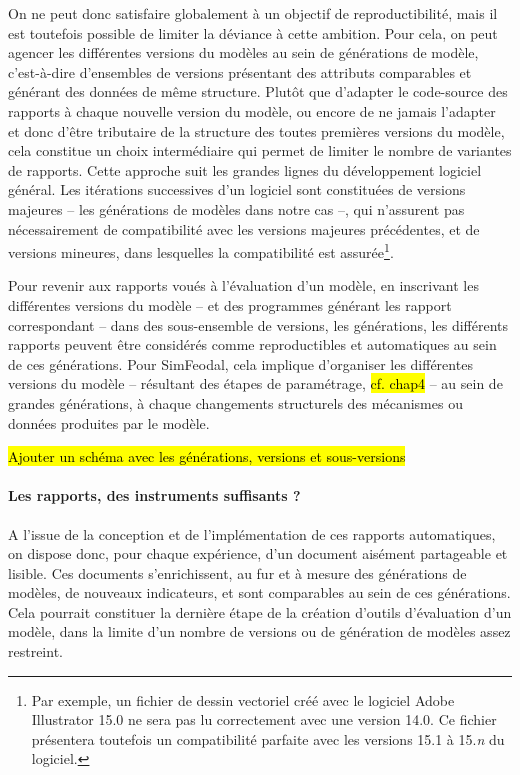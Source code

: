 	On ne peut donc satisfaire globalement à un objectif de reproductibilité, mais il est toutefois possible de limiter la déviance à cette ambition.
	Pour cela, on peut agencer les différentes versions du modèles au sein de \og générations\fg{} de modèle, c'est-à-dire d'ensembles de versions présentant des attributs comparables et générant des données de même structure.
	Plutôt que d'adapter le code-source des rapports à chaque nouvelle version du modèle, ou encore de ne jamais l'adapter et donc d'être tributaire de la structure des toutes premières versions du modèle, cela constitue un choix intermédiaire qui permet de limiter le nombre de variantes de rapports.
	Cette approche suit les grandes lignes du développement logiciel général. Les itérations successives d'un logiciel sont constituées de versions \og majeures\fg{} -- les générations de modèles dans notre cas --, qui n'assurent pas nécessairement de compatibilité avec les versions majeures précédentes, et de versions \og mineures\fg{}, dans lesquelles la compatibilité est assurée\footnote{
		Par exemple, un fichier de dessin vectoriel créé avec le logiciel Adobe Illustrator 15.0 ne sera pas lu correctement avec une version 14.0.
		Ce fichier présentera toutefois un compatibilité parfaite avec les versions 15.1 à 15.\textit{n} du logiciel.
	}.
	
	Pour revenir aux rapports voués à l'évaluation d'un modèle, en inscrivant les différentes versions du modèle -- et des programmes générant les rapport correspondant -- dans des sous-ensemble de versions, les \og générations\fg{}, les différents rapports peuvent être considérés comme reproductibles et automatiques au sein de ces générations.
	Pour SimFeodal, cela implique d'organiser les différentes versions du modèle -- résultant des étapes de paramétrage, \hl{cf. chap4} -- au sein de grandes générations, à chaque changements structurels des mécanismes ou données produites par le modèle.
	
	\hl{Ajouter un schéma avec les générations, versions et sous-versions}
	
	\paragraph{Les rapports, des instruments suffisants ?}
	
	A l'issue de la conception et de l'implémentation de ces rapports automatiques, on dispose donc, pour chaque expérience, d'un document aisément partageable et lisible.
	Ces documents s'enrichissent, au fur et à mesure des générations de modèles, de nouveaux indicateurs, et sont comparables au sein de ces générations.
	Cela pourrait constituer la dernière étape de la création d'outils d'évaluation d'un modèle, dans la limite d'un nombre de versions ou de génération de modèles assez restreint.
	
